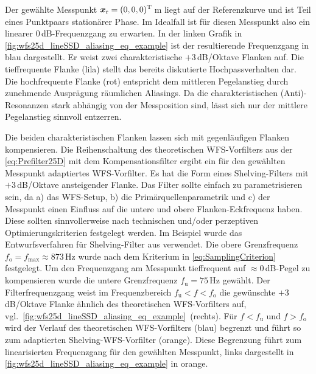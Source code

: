 %
Der gewählte Messpunkt $\bm{x}_\mathrm{r} = (0,0,0)^\mathrm{T}$\,m liegt auf der
Referenzkurve und ist Teil eines Punktpaars stationärer Phase.
%
Im Idealfall ist für diesen Messpunkt also ein linearer $0$\,dB-Frequenzgang
zu erwarten.
%
In der linken Grafik in \Abb\ref{fig:wfs25d_lineSSD_aliasing_eq_example}
ist der resultierende Frequenzgang in blau dargestellt.
%
Er weist zwei charakteristische $+3$\,dB/Oktave Flanken auf.
%
Die tieffrequente Flanke (lila) stellt das bereits diskutierte Hochpassverhalten
dar.
%
Die hochfrequente Flanke (rot) entspricht dem mittleren Pegelanstieg
durch zunehmende Ausprägung räumlichen Aliasings.
%
Da die charakteristischen (Anti)-Resonanzen stark abhängig von der
Messposition sind, lässt sich nur der mittlere Pegelanstieg sinnvoll entzerren.



Die beiden charakteristischen Flanken lassen sich mit gegenläufigen Flanken
kompensieren.
%
Die Reihenschaltung des theoretischen WFS-Vorfilters aus
der \Glg\eqref{eq:Prefilter25D} mit dem Kompensationsfilter ergibt ein für den
gewählten Messpunkt adaptiertes WFS-Vorfilter.
%
Es hat die Form eines Shelving-Filters mit $+3$\,dB/Oktave ansteigender Flanke.
%
Das Filter sollte einfach zu parametrisieren sein, da a) das WFS-Setup,
b) die Primärquellenparametrik und c) der Messpunkt einen Einfluss auf die untere
und obere Flanken-Eckfrequenz haben.
%
Diese sollten sinnvollerweise nach technischen und/oder perzeptiven
Optimierungskriterien festgelegt werden.
%
Im Beispiel wurde das Entwurfsverfahren für Shelving-Filter aus \cite{Schultz2020a}
verwendet.
%
Die obere Grenzfrequenz $f_\text{o}=f_\text{max} \approx 873$\,Hz wurde
nach dem Kriterium in \Glg\eqref{eq:SamplingCriterion} festgelegt.
%
Um den Frequenzgang am Messpunkt tieffrequent auf $\approx 0$\,dB-Pegel zu
kompensieren wurde die untere Grenzfrequenz $f_\text{u}=75$\,Hz
gewählt.
%
Der Filterfrequenzgang weist im Frequenzbereich $f_\text{u} < f < f_\text{o}$
die gewünschte $+3$\,dB/Oktave Flanke ähnlich des theoretischen WFS-Vorfilters auf,
vgl.~\Abb\ref{fig:wfs25d_lineSSD_aliasing_eq_example}~(rechts).
%
Für $f<f_\text{u}$ und $f>f_\text{o}$ wird der Verlauf des
theoretischen WFS-Vorfilters (blau) begrenzt und führt so zum adaptierten
Shelving-WFS-Vorfilter (orange).
%
Diese Begrenzung führt zum linearisierten Frequenzgang für den gewählten Messpunkt,
links dargestellt in \Abb\ref{fig:wfs25d_lineSSD_aliasing_eq_example} in orange.



